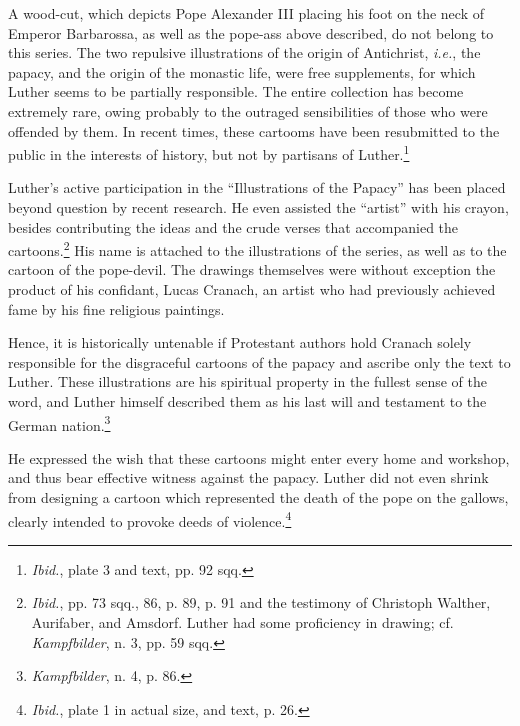 A wood-cut, which depicts Pope Alexander III placing his foot on
the neck of Emperor Barbarossa, as well as the pope-ass above described,
do not belong to this series. The two repulsive illustrations of
the origin of Antichrist, \textit{i.e.}, the papacy, and the origin of the monastic
life, were free supplements, for which Luther seems to be partially responsible.
The entire collection has become extremely rare,
owing probably to the outraged sensibilities of those who were offended
by them. In recent times, these cartooms have been resubmitted to the
public in the interests of history, but not by partisans of Luther.\footnote{\textit{Ibid.}, plate 3 and text, pp. 92 sqq.}

Luther’s active participation in the “Illustrations of the Papacy”
has been placed beyond question by recent research. He even assisted
the “artist” with his crayon, besides contributing the ideas
and the crude verses that accompanied the cartoons.\footnote
{\textit{Ibid.}, pp. 73 sqq., 86, p. 89, p. 91 and the testimony of Christoph Walther, Aurifaber,
and Amsdorf. Luther had some proficiency in drawing; cf. \textit{Kampfbilder}, n. 3, pp. 59 sqq.}
His name is
attached to the illustrations of the series, as well as to the cartoon of
the pope-devil. The drawings themselves were without exception the
product of his confidant, Lucas Cranach, an artist who had previously
achieved fame by his fine religious paintings.

Hence, it is historically untenable if Protestant authors hold Cranach
solely responsible for the disgraceful cartoons of the papacy and
ascribe only the text to Luther. These illustrations are his spiritual
property in the fullest sense of the word, and Luther himself described
them as his last will and testament to the German nation.\footnote{\textit{Kampfbilder}, n. 4, p. 86.}

He expressed the wish that these cartoons might enter every home
and workshop, and thus bear effective witness against the papacy.
Luther did not even shrink from designing a cartoon which represented
the death of the pope on the gallows, clearly intended to provoke deeds
of violence.\footnote{\textit{Ibid.}, plate 1 in actual size, and text, p. 26.}

